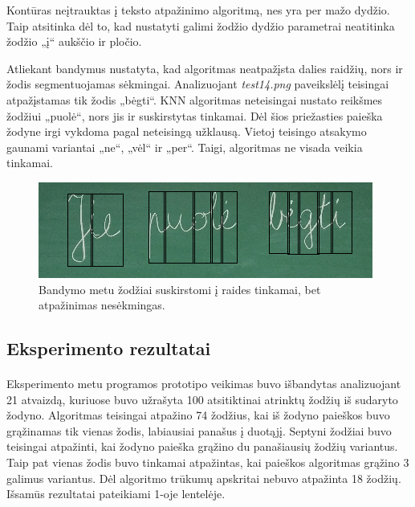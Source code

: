 \documentclass[a4paper,12pt]{article}
\begin{document}
Kontūras neįtrauktas į teksto atpažinimo algoritmą, nes yra per mažo dydžio. Taip atsitinka dėl to, kad nustatyti galimi žodžio dydžio parametrai neatitinka žodžio „į“ aukščio ir pločio.

Atliekant bandymus nustatyta, kad algoritmas neatpažįsta dalies raidžių, nors ir žodis segmentuojamas sėkmingai. Analizuojant \textit{test14.png} paveikslėlį teisingai atpažįstamas tik žodis „bėgti“. KNN algoritmas neteisingai nustato reikšmes žodžiui „puolė“, nors jis ir suskirstytas tinkamai. Dėl šios priežasties paieška žodyne irgi vykdoma pagal neteisingą užklausą. Vietoj teisingo atsakymo gaunami variantai „ne“, „vėl“ ir „per“. Taigi, algoritmas ne visada veikia tinkamai.


 	\begin{figure}[H]
 		\centering
 		\includegraphics[scale=0.6]{images/test14}
 		\caption{Bandymo metu žodžiai suskirstomi į raides tinkamai, bet atpažinimas nesėkmingas.}   %
 		\label{img:test14}
 	\end{figure}
 	
\subsection{Eksperimento rezultatai}
\paragraph{} Eksperimento metu programos prototipo veikimas buvo išbandytas analizuojant 21 atvaizdą, kuriuose buvo užrašyta 100 atsitiktinai atrinktų žodžių iš sudaryto žodyno. Algoritmas teisingai atpažino 74 žodžius, kai iš žodyno paieškos buvo grąžinamas tik vienas žodis, labiausiai panašus į duotąjį. Septyni žodžiai buvo teisingai atpažinti, kai žodyno paieška grąžino du panašiausių žodžių variantus. Taip pat vienas žodis buvo tinkamai atpažintas, kai paieškos algoritmas grąžino 3 galimus variantus.
Dėl algoritmo trūkumų apskritai nebuvo atpažinta 18 žodžių. Išsamūs rezultatai pateikiami 1-oje lentelėje.
\end{document}
